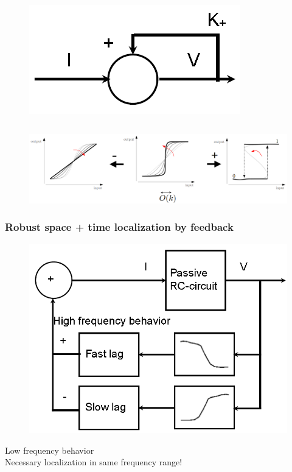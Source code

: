 \documentclass{beamer}
\begin{document}
\begin{frame}
\begin{columns}[c]
\begin{figure}
\includegraphics[width=1\linewidth]{memory}
\end{figure}
\\

\end{columns}
\begin{figure}
\includegraphics[width=1\linewidth]{balanced_feedback}
\end{figure}
\vspace{-2ex}
\end{frame}


\begin{frame}
\frametitle{Robust space + time localization by feedback}
\begin{figure}
\includegraphics[width=.7\linewidth]{robust}
\end{figure}
Low frequency behavior\\
Necessary localization in same frequency range!
\end{frame}
\end{document}
